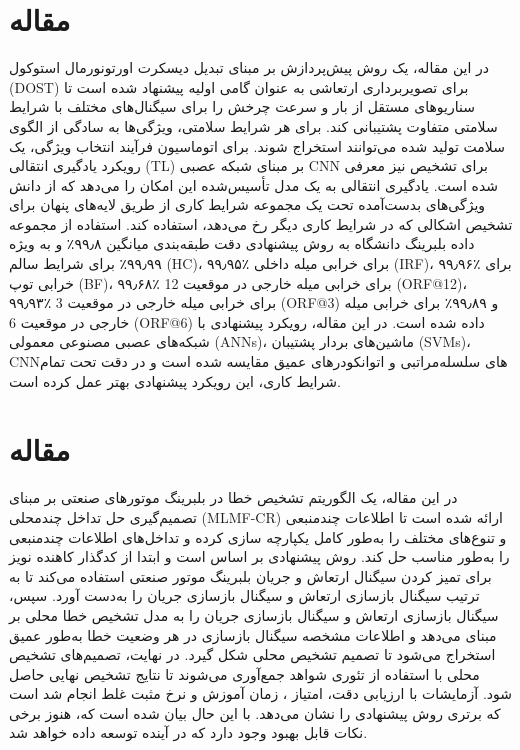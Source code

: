 \documentclass[a4paper,10pt]{article}
\begin{document}
\section{مقاله \textcolor{blue}{\cite{article36}}}
در این مقاله، یک روش پیش‌پردازش بر مبنای تبدیل دیسکرت اورتونورمال استوکول (DOST) برای تصویربرداری ارتعاشی به عنوان گامی اولیه پیشنهاد شده است تا سناریوهای مستقل از بار و سرعت چرخش را برای سیگنال‌های مختلف با شرایط سلامتی متفاوت پشتیبانی کند. برای هر شرایط سلامتی، ویژگی‌ها به سادگی از الگوی سلامت تولید شده می‌توانند استخراج شوند. برای اتوماسیون فرآیند انتخاب ویژگی، یک رویکرد یادگیری انتقالی (TL) بر مبنای شبکه عصبی CNN برای تشخیص نیز معرفی شده است. یادگیری انتقالی به یک مدل تأسیس‌شده این امکان را می‌دهد که از دانش ویژگی‌های بدست‌آمده تحت یک مجموعه شرایط کاری از طریق لایه‌های پنهان برای تشخیص اشکالی که در شرایط کاری دیگر رخ می‌دهد، استفاده کند. استفاده از مجموعه داده بلبرینگ دانشگاه  به روش پیشنهادی دقت طبقه‌بندی میانگین ۹۹٫۸٪ و به ویژه ۹۹٫۹۹٪ برای شرایط سالم (HC)، ۹۹٫۹۵٪ برای خرابی میله داخلی (IRF)، ۹۹٫۹۶٪ برای خرابی توپ (BF)، ۹۹٫۶۸٪ برای خرابی میله خارجی در موقعیت 12 (ORF@12)، ۹۹٫۹۳٪ برای خرابی میله خارجی در موقعیت 3 (ORF@3) و ۹۹٫۸۹٪ برای خرابی میله خارجی در موقعیت 6 (ORF@6) داده شده است. در این مقاله، رویکرد پیشنهادی با شبکه‌های عصبی مصنوعی معمولی (ANNs)، ماشین‌های بردار پشتیبان (SVMs)، CNNهای سلسله‌مراتبی و اتوانکودرهای عمیق مقایسه شده است و در دقت تحت تمام شرایط کاری، این رویکرد پیشنهادی بهتر عمل کرده است.


\section{مقاله \textcolor{blue}{\cite{article22}}}
در این مقاله، یک الگوریتم تشخیص خطا در بلبرینگ موتورهای صنعتی بر مبنای تصمیم‌گیری حل تداخل چندمحلی (MLMF-CR) ارائه شده است تا اطلاعات چندمنبعی و تنوع‌های مختلف را به‌طور کامل یکپارچه سازی کرده و تداخل‌های اطلاعات چندمنبعی را به‌طور مناسب حل کند. روش پیشنهادی بر اساس  است و ابتدا از کدگذار کاهنده نویز برای تمیز کردن سیگنال ارتعاش و جریان بلبرینگ موتور صنعتی استفاده می‌کند تا به ترتیب سیگنال بازسازی ارتعاش و سیگنال بازسازی جریان را به‌دست آورد. سپس، سیگنال بازسازی ارتعاش و سیگنال بازسازی جریان را به مدل تشخیص خطا محلی بر مبنای  می‌دهد و اطلاعات مشخصه سیگنال بازسازی در هر وضعیت خطا به‌طور عمیق استخراج می‌شود تا تصمیم تشخیص محلی شکل گیرد. در نهایت، تصمیم‌های تشخیص محلی با استفاده از تئوری شواهد  جمع‌آوری می‌شوند تا نتایج تشخیص نهایی حاصل شود. آزمایشات با ارزیابی دقت، امتیاز ، زمان آموزش و نرخ مثبت غلط انجام شد است که برتری روش پیشنهادی را نشان می‌دهد. با این حال بیان شده است که، هنوز برخی نکات قابل بهبود وجود دارد که در آینده توسعه داده خواهد شد.
\end{document}
